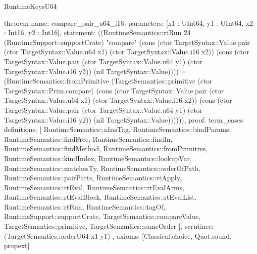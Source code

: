 \begin{lexlean}{RuntimeKeysU64}
\begin{semanticmodule}
theorem{
  name: compare_pair_u64_i16,
  parameters: [x1 : UInt64, y1 : UInt64, x2 : Int16, y2 : Int16],
  statement: ((RuntimeSemantics::rtRun 24 (RuntimeSupport::supportCrate) "compare" (cons (ctor TargetSyntax::Value.pair (ctor TargetSyntax::Value.u64 x1) (ctor TargetSyntax::Value.i16 x2)) (cons (ctor TargetSyntax::Value.pair (ctor TargetSyntax::Value.u64 y1) (ctor TargetSyntax::Value.i16 y2)) (nil TargetSyntax::Value)))) = (RuntimeSemantics::fromPrimitive (TargetSemantics::primitive (ctor TargetSyntax::Prim.compare) (cons (ctor TargetSyntax::Value.pair (ctor TargetSyntax::Value.u64 x1) (ctor TargetSyntax::Value.i16 x2)) (cons (ctor TargetSyntax::Value.pair (ctor TargetSyntax::Value.u64 y1) (ctor TargetSyntax::Value.i16 y2)) (nil TargetSyntax::Value)))))),
  proof: term_cases{
    definitions: [
      RuntimeSemantics::aliasTag,
      RuntimeSemantics::bindParams,
      RuntimeSemantics::findFree,
      RuntimeSemantics::findIn,
      RuntimeSemantics::findMethod,
      RuntimeSemantics::fromPrimitive,
      RuntimeSemantics::kindIndex,
      RuntimeSemantics::lookupVar,
      RuntimeSemantics::matchesTy,
      RuntimeSemantics::orderOfPath,
      RuntimeSemantics::pairParts,
      RuntimeSemantics::rtApply,
      RuntimeSemantics::rtEval,
      RuntimeSemantics::rtEvalArms,
      RuntimeSemantics::rtEvalBlock,
      RuntimeSemantics::rtEvalList,
      RuntimeSemantics::rtRun,
      RuntimeSemantics::tagOf,
      RuntimeSupport::supportCrate,
      TargetSemantics::compareValue,
      TargetSemantics::primitive,
      TargetSemantics::sameOrder
    ],
    scrutinee: (TargetSemantics::orderU64 x1 y1)
  },
  axioms: [Classical.choice, Quot.sound, propext]
}


\end{semanticmodule}
\end{lexlean}
